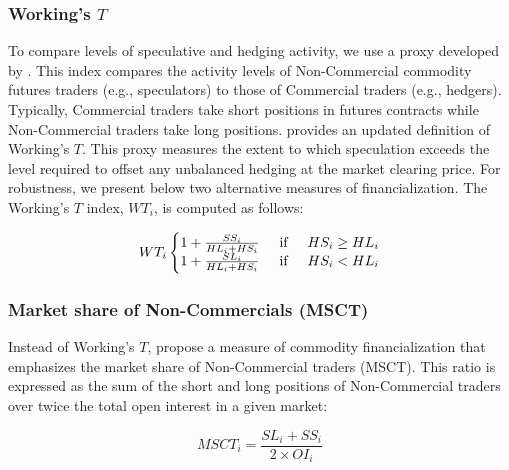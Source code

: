 \documentclass[12pt]{article}
\begin{document}
\subsubsection{Working's $T$}
To compare levels of speculative and hedging activity, we use a proxy developed by \citet{working1960speculation}. This index compares the activity levels of Non-Commercial commodity futures traders (e.g., speculators) to those of Commercial traders (e.g., hedgers). Typically, Commercial traders take short positions in futures contracts while Non-Commercial traders take long positions.   \citet{shanker2017new} provides an updated definition of Working’s $T$. This proxy measures the extent to which speculation exceeds the level required to offset any unbalanced hedging at the market clearing price. For robustness, we present below two alternative measures of financialization. The Working's $T$ index, $WT_i$, is computed as follows:


\begin{equation} \label{eqn:Working}
WT_i\left\{\begin{matrix}
 1+\frac{SS_i}{HL_i+HS_i} \hspace{0.5cm} \mbox{if} \hspace{0.5cm} HS_i \ge HL_i\\
1+\frac{SL_i}{HL_i+HS_i} \hspace{0.5cm} \mbox{if} \hspace{0.5cm} HS_i < HL_i
\end{matrix}\right.
\end{equation}


\subsubsection{Market share of Non-Commercials (MSCT)}
Instead of Working’s $T$, \citet*{buyukcsahin2014speculators} propose a measure of commodity financialization that emphasizes the market share of Non-Commercial traders (MSCT). This ratio is expressed as  the sum of the short and long positions of Non-Commercial traders over twice the total open interest in a given market: 



\begin{equation} \label{eqn:MSCT}
MSCT_i=\frac{SL_i+SS_i}{2 \times OI_i}
\end{equation}
\end{document}
